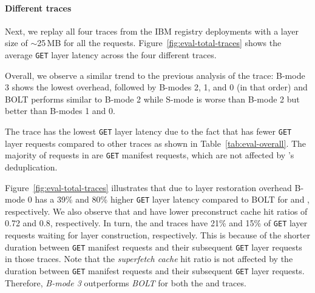 \paragraph{Different traces} Next, we replay all four traces from the IBM registry deployments
with a layer size of $\sim$25\,MB for all the requests.
%
%
Figure~\ref{fig:eval-total-traces} shows the average \texttt{GET} layer latency across the four different traces.


Overall, we observe a similar trend to the previous analysis of the
\dal trace: B-mode 3 shows the lowest overhead, followed by
B-modes 2, 1, and 0 (in that order) and BOLT performs similar to B-mode 2
while S-mode is worse than B-mode 2 but better than B-modes 1 and 0.

The \lon trace has the lowest \texttt{GET} layer latency due to the fact that
\lon has fewer \texttt{GET} layer requests compared to other traces as shown in Table~\ref{tab:eval-overall}. 
%
The majority of requests in \lon are \texttt{GET} manifest requests, which are not affected
by \sysname{}'s deduplication.
%

Figure~\ref{fig:eval-total-traces} illustrates that due to layer restoration overhead
B-mode 0 has a 39\% and 80\% higher \texttt{GET} layer latency
compared to BOLT for \fra and \lon, respectively.
%
We also observe that \fra and \lon have lower preconstruct
cache hit ratios of 0.72 and 0.8, respectively.
%
In turn, the \fra and \lon traces have 21\% and 15\% of \texttt{GET} layer
requests waiting for layer construction, respectively.
%
%
This is because of the shorter duration between \texttt{GET} manifest requests and
their subsequent \texttt{GET} layer requests in those traces.
%
Note that the \emph{superfetch cache} hit ratio is not affected by the duration between \texttt{GET} manifest
requests and their subsequent \texttt{GET} layer requests.
%
%
Therefore, \emph{B-mode 3} outperforms \emph{BOLT} for both the \fra and \lon traces.
%
%
%


